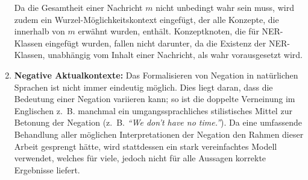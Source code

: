 \begin{enumerate}
		Da die Gesamtheit einer Nachricht $m$ nicht unbedingt wahr sein muss, wird zudem ein Wurzel-Möglichkeitskontext eingefügt, der alle Konzepte, die innerhalb von $m$ erwähnt wurden, enthält.
		Konzeptknoten, die für NER-Klassen eingefügt wurden, fallen nicht darunter, da die Existenz der NER-Klassen, unabhängig vom Inhalt einer Nachricht, als wahr vorausgesetzt wird.

	\item \textbf{Negative Aktualkontexte:}
		Das Formalisieren von Negation in natürlichen Sprachen ist nicht immer eindeutig möglich.
		Dies liegt daran, dass die Bedeutung einer Negation variieren kann; so ist die doppelte Verneinung im Englischen z.~B. manchmal ein umgangssprachliches stilistisches Mittel zur Betonung der Negation (z.~B. \textit{``We don't have no time.''}).
		Da eine umfassende Behandlung aller möglichen Interpretationen der Negation den Rahmen dieser Arbeit gesprengt hätte, wird stattdessen ein stark vereinfachtes Modell verwendet, welches für viele, jedoch nicht für alle Aussagen korrekte Ergebnisse liefert.


\end{enumerate}
